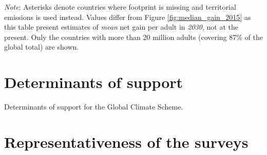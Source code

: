 \clearpage
{}
    {\footnotesize \textit{Note}: %
    Asterisks denote countries where footprint is missing and territorial emissions is used instead. %
    Values differ from Figure \ref{fig:median_gain_2015} as this table present estimates of \textit{mean} net gain per adult in \textit{2030}, not at the present. Only the countries with more than 20 million adults (covering 87\% of the global total) are shown. 
    }


\clearpage
\section{Determinants of support}\label{app:determinants}

\begin{table}[h]\label{tab:gcs_determinant}
    \caption[Determinants of support for the GCS]{Determinants of support for the Global Climate Scheme.} 
    \makebox[\textwidth][c]{
\resizebox*{!}{.73\textheight}{ %
        
        }
    }
    {\footnotesize %
    }
\end{table}

\clearpage
\section{Representativeness of the surveys}\label{app:representativeness}


